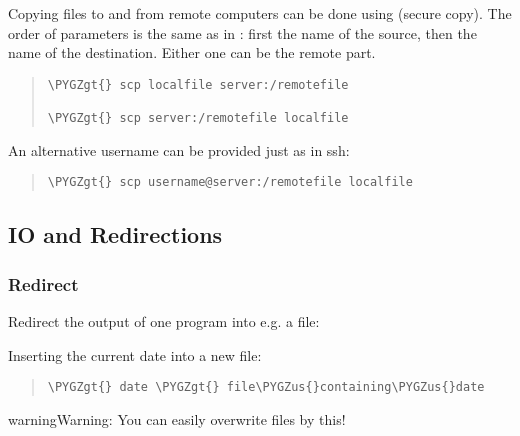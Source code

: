 \documentclass[a4paper,11pt,english]{sphinxmanual}
\def\PYGZus{\char`\_}
\def\PYGZgt{\char`\>}
\begin{document}
Copying files to and from remote computers can be done using   (secure copy).
The order of parameters is the same as in : first the name of the source, then the name of the destination. Either one can be the remote part.
\begin{quote}

\begin{Verbatim}[frame=single, rulecolor=\color{lightgray}, fontfamily=courier, commandchars=\\\{\}]
\PYGZgt{} scp localfile server:/remotefile

\PYGZgt{} scp server:/remotefile localfile
\end{Verbatim}
\end{quote}

An alternative username can be provided just as in ssh:
\begin{quote}

\begin{Verbatim}[frame=single, rulecolor=\color{lightgray}, fontfamily=courier, commandchars=\\\{\}]
\PYGZgt{} scp username@server:/remotefile localfile
\end{Verbatim}
\end{quote}


\subsection{IO and Redirections}
\label{introduction:io-and-redirections}

\subsubsection{Redirect}
\label{introduction:redirect}
Redirect the output of one program into e.g. a file:

Inserting the current date into a new file:
\begin{quote}

\begin{Verbatim}[frame=single, rulecolor=\color{lightgray}, fontfamily=courier, commandchars=\\\{\}]
\PYGZgt{} date \PYGZgt{} file\PYGZus{}containing\PYGZus{}date
\end{Verbatim}
\end{quote}

\begin{notice}{warning}{Warning:}
You can easily overwrite files by this!
\end{notice}
\end{document}
